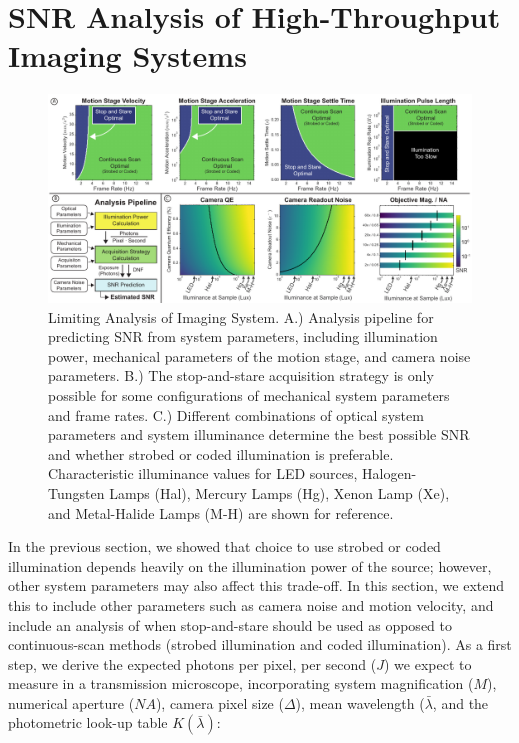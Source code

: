 \section{SNR Analysis of High-Throughput Imaging Systems}\label{sec:highthroughput_component_analysis}

\begin{figure}
  \centering
    \includegraphics[width=1.0\textwidth]{figures/fig_highthroughput_limiting_analysis.pdf}
      \caption{\label{fig:component_analysis} Limiting Analysis of Imaging System. A.) Analysis pipeline for predicting SNR from system parameters, including illumination power, mechanical parameters of the motion stage, and camera noise parameters. B.) The stop-and-stare acquisition strategy is only possible for some configurations of mechanical system parameters and frame rates. C.) Different combinations of optical system parameters and system illuminance determine the best possible SNR and whether strobed or coded illumination is preferable. Characteristic illuminance values for LED sources, Halogen-Tungsten Lamps (Hal), Mercury Lamps (Hg), Xenon Lamp (Xe), and Metal-Halide Lamps (M-H) are shown for reference. }
\end{figure}

In the previous section, we showed that choice to use strobed or coded illumination depends heavily on the illumination power of the source; however, other system parameters may also affect this trade-off. In this section, we extend this to include other parameters such as camera noise and motion velocity, and include an analysis of when stop-and-stare should be used as opposed to continuous-scan methods (strobed illumination and coded illumination). As a first step, we derive the expected photons per pixel, per second ($J$) we expect to measure in a transmission microscope, incorporating system magnification ($M$), numerical aperture ($NA$), camera pixel size ($\Delta$), mean wavelength ($\bar{\lambda}$, and the photometric look-up table $K(\bar{\lambda})$:

